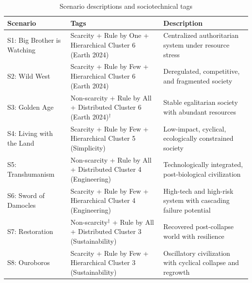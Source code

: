 \begin{table}[htbp]
\centering
\caption{Scenario descriptions and sociotechnical tags}
\label{tab:scenarios}
\setlength{\tabcolsep}{8pt}
\renewcommand{\arraystretch}{1.25}
{\raggedright
\begin{tabular}{l p{4.5cm} p{5.5cm}}
\toprule
Scenario & Tags & Description \\
\midrule
S1: Big Brother is Watching &
Scarcity + Rule by One + Hierarchical \newline Cluster 6 (Earth 2024) &
Centralized authoritarian system under resource stress \\

S2: Wild West &
Scarcity + Rule by Few + Hierarchical \newline Cluster 6 (Earth 2024) &
Deregulated, competitive, and fragmented society \\

S3: Golden Age &
Non-scarcity + Rule by All + Distributed \newline Cluster 6 (Earth 2024)$^{\dagger}$ &
Stable egalitarian society with abundant resources \\

S4: Living with the Land &
Scarcity + Rule by Few + Hierarchical \newline Cluster 5 (Simplicity) &
Low-impact, cyclical, ecologically constrained society \\

S5: Transhumanism &
Non-scarcity + Rule by All + Distributed \newline Cluster 4 (Engineering) &
Technologically integrated, post-biological civilization \\

S6: Sword of Damocles &
Scarcity + Rule by Few + Hierarchical \newline Cluster 4 (Engineering) &
High-tech and high-risk system with cascading failure potential \\

S7: Restoration &
Non-scarcity$^{\ddagger}$ + Rule by All + Distributed \newline Cluster 3 (Sustainability) &
Recovered post-collapse world with resilience \\

S8: Ouroboros &
Scarcity + Rule by Few + Hierarchical \newline Cluster 3 (Sustainability) &
Oscillatory civilization with cyclical collapse and regrowth \\


\end{tabular}}
\end{table}
